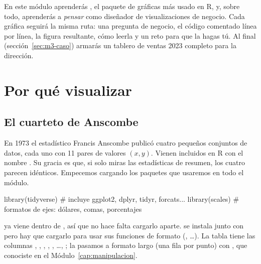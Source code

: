 En este módulo aprenderás , el paquete de gráficas más usado
en R, y, sobre todo, aprenderás a \emph{pensar} como diseñador de
visualizaciones de negocio. Cada gráfica seguirá la misma ruta: una pregunta
de negocio, el código comentado línea por línea, la figura resultante, cómo
leerla y un reto para que la hagas tú. Al final (sección~\ref{sec:m3-caso})
armarás un tablero de ventas 2023 completo para la dirección.

\section{Por qué visualizar}
\label{sec:m3-por-que}

\subsection{El cuarteto de Anscombe}

En 1973 el estadístico Francis Anscombe publicó cuatro pequeños conjuntos de
datos, cada uno con 11 pares de valores $(x, y)$. Vienen incluidos en R con
el nombre . Su gracia es que, si solo miras las
estadísticas de resumen, los cuatro parecen idénticos. Empecemos cargando
los paquetes que usaremos en todo el módulo.

\begin{rcode}
library(tidyverse)   # incluye ggplot2, dplyr, tidyr, forcats...
library(scales)      # formatos de ejes: dólares, comas, porcentajes
\end{rcode}

 ya viene dentro de , así que no hace
falta cargarlo aparte.  se instala junto con
 pero hay que cargarlo para usar sus funciones de formato
(, \ldots). La tabla 
tiene las columnas , , , ,
, \ldots, ; la pasamos a formato largo (una fila por
punto) con , que conociste en el
Módulo~\ref{cap:manipulacion}.

